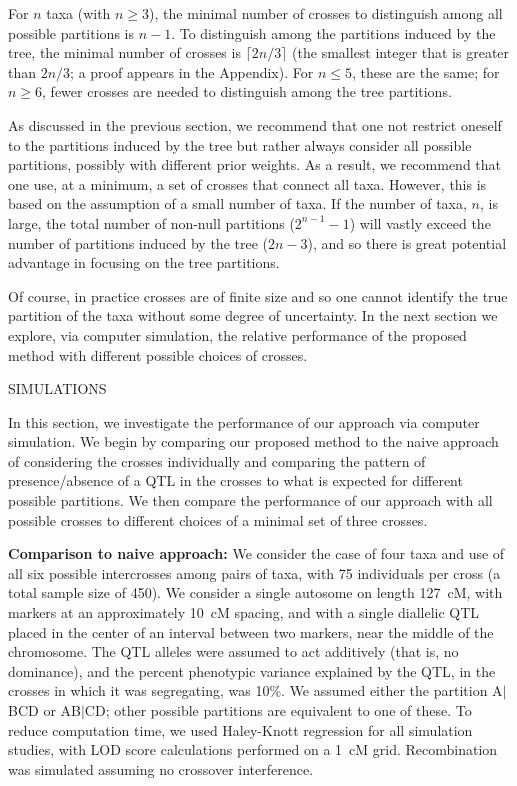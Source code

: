 \documentclass[12pt,letterpaper]{article}
\begin{document}
For $n$ taxa (with $n \ge 3$), the minimal number of
crosses to distinguish among all possible partitions is $n-1$.  To
distinguish among the partitions induced by the tree, the minimal
number of crosses is $\lceil 2n/3 \rceil$ (the smallest integer that
is greater than $2n/3$; a proof appears in the Appendix).  For $n
\le 5$, these are the same; for $n \ge 6$, fewer crosses are needed
to distinguish among the tree partitions.

As discussed in the previous section, we recommend that one not restrict oneself to the
partitions induced by the tree but rather always consider all
possible partitions, possibly with different prior weights.  As a result, we recommend that one use, at a
minimum, a set of crosses that connect all taxa.  
However, this is based on the assumption of a small
number of taxa.  If the number of taxa, $n$, is large, the total number of
non-null partitions ($2^{n-1}-1$) will vastly exceed the number of partitions induced
by the tree ($2n-3$), and so there is great potential advantage in focusing
on the tree partitions.

Of course, in practice crosses are of finite size and so one cannot
identify the true partition of the taxa without some degree of
uncertainty.  In the next section we explore, via computer
simulation, the relative performance of the proposed method with
different possible choices of crosses.




\clearpage

\centerline{SIMULATIONS}

In this section, we investigate the performance of our approach via
computer simulation.  We begin by comparing our proposed method to the
naive approach of considering the crosses individually and
comparing the pattern of presence/absence of a QTL in the crosses
to what is expected for different possible partitions.  We then
compare the performance of our approach with all possible crosses to different choices of a
minimal set of three crosses.

\textbf{Comparison to naive approach:} We consider the case of four taxa and use of all six possible
intercrosses among pairs of taxa, with 75 individuals per cross (a
total sample size of 450).  We
consider a single autosome on length 127~cM, with markers at an approximately 10~cM
spacing, and with a single diallelic QTL placed in the center of an
interval between two markers, near the middle of the chromosome.  The
QTL alleles were assumed to act additively (that is, no dominance),
and the percent phenotypic variance explained by the QTL, in the
crosses in which it was segregating, was 10\%.  We assumed either the
partition A$|$BCD or AB$|$CD; other possible partitions are equivalent
to one of these.  To reduce computation time, we used Haley-Knott
regression \citep{Haley1992} for all simulation studies, with LOD
score calculations performed on a 1~cM grid.  Recombination was
simulated assuming no crossover interference.
\end{document}
